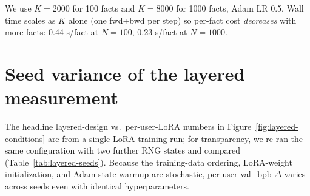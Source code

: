 \documentclass[letterpaper]{article} %
\begin{document}
We use $K = 2000$ for 100 facts and $K = 8000$ for 1000 facts, Adam
LR 0.5. Wall time scales as $K$ alone (one fwd+bwd per step) so per-fact
cost \emph{decreases} with more facts: 0.44 s/fact at $N{=}100$,
0.23 s/fact at $N{=}1000$.

\section{Seed variance of the layered measurement}
\label{app:layered-seeds}

The headline layered-design vs.\ per-user-LoRA numbers in
Figure~\ref{fig:layered-conditions} are
from a single LoRA training run; for transparency, we re-ran the same
configuration with two further RNG states and compared
(Table~\ref{tab:layered-seeds}). Because the
training-data ordering, LoRA-weight initialization, and Adam-state
warmup are stochastic, per-user val\_bpb $\Delta$ varies across seeds
even with identical hyperparameters.
\end{document}
